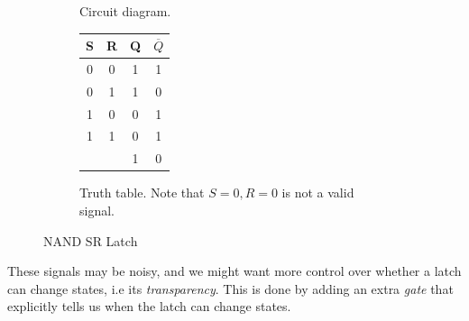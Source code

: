 \begin{theorem}
\begin{figure}[H]
\begin{subfigure}[b]{0.48\textwidth}
        \caption{Circuit diagram.}
      \end{subfigure}
      \hfill 
      \begin{subfigure}[b]{0.48\textwidth}
        \centering
        \begin{tabular}{|c|c|c|c|}
          \hline
          \textbf{S} & \textbf{R} & \textbf{Q} & \textbf{$\overline{Q}$} \\
          \hline
          0 & 0 & 1 & 1 \\
          \hline
          0 & 1 & 1 & 0 \\
          \hline
          1 & 0 & 0 & 1 \\
          \hline
          1 & 1 & 0 & 1 \\
            &   & 1 & 0 \\
          \hline
        \end{tabular}
        \caption{Truth table. Note that $S=0, R=0$ is not a valid signal.}
      \end{subfigure}
      \caption{NAND SR Latch}
    \end{figure}
  \end{theorem}

  These signals may be noisy, and we might want more control over whether a latch can change states, i.e its \textit{transparency}. This is done by adding an extra \textit{gate} that explicitly tells us when the latch can change states. 

